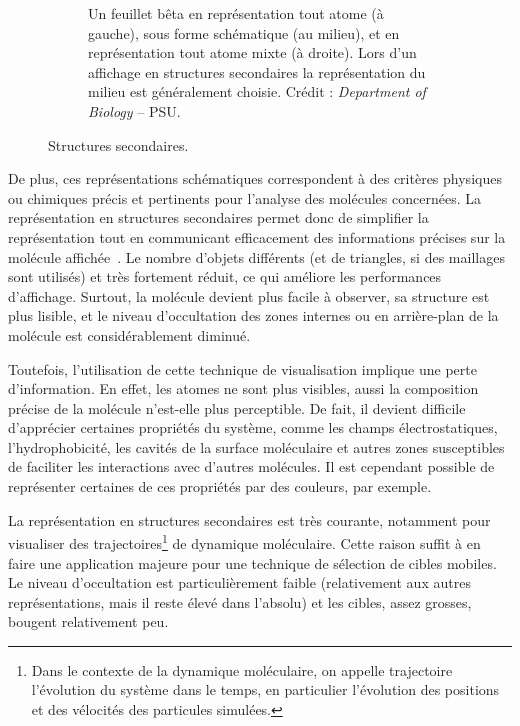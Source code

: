 \begin{figure}[H]
\begin{subfigure}[b]{.49\textwidth}
			\caption[Feuillets bêta]{Un feuillet bêta en représentation \og tout atome \fg{} (à gauche), sous forme schématique (au milieu), et en représentation \og tout atome \fg{} mixte (à droite). Lors d'un affichage \og en structures secondaires \fg{} la représentation du milieu est généralement choisie. Crédit : \emph{Department of Biology} -- PSU\footnotemark.}
			\label{fig:bSheet}
		\end{subfigure}
		\caption{Structures secondaires.}
		\label{fig:secStructs}
	\end{figure}
	
	\addtocounter{footnote}{-1}
	\addtocounter{footnote}{1}
		
	De plus, ces représentations schématiques correspondent à des critères physiques ou chimiques précis et pertinents pour l'analyse des molécules concernées. La représentation en structures secondaires permet donc de simplifier la représentation tout en communicant efficacement des informations précises sur la molécule affichée~\cite{richardson2002teaching}. Le nombre d'objets différents (et de triangles, si des maillages sont utilisés) et très fortement réduit, ce qui améliore les performances d'affichage. Surtout, la molécule devient plus facile à observer, sa structure est plus lisible, et le niveau d'occultation des zones internes ou en arrière-plan de la molécule est considérablement diminué.
		
	Toutefois, l'utilisation de cette technique de visualisation implique une perte d'information. En effet, les atomes ne sont plus visibles, aussi la composition précise de la molécule n'est-elle plus perceptible. De fait, il devient difficile d'apprécier certaines propriétés du système, comme les champs électrostatiques, l'hydrophobicité, les cavités de la surface moléculaire et autres zones susceptibles de faciliter les interactions avec d'autres molécules. Il est cependant possible de représenter certaines de ces propriétés par des couleurs, par exemple.
		
	La représentation en structures secondaires est très courante, notamment pour visualiser des trajectoires\footnote{Dans le contexte de la dynamique moléculaire, on appelle \og trajectoire \fg{} l'évolution du système dans le temps, en particulier l'évolution des positions et des vélocités des particules simulées.} de dynamique moléculaire. Cette raison suffit à en faire une application majeure pour une technique de sélection de cibles mobiles. Le niveau d'occultation est particulièrement faible (relativement aux autres représentations, mais il reste élevé dans l'absolu) et les cibles, assez grosses, bougent relativement peu.
		

